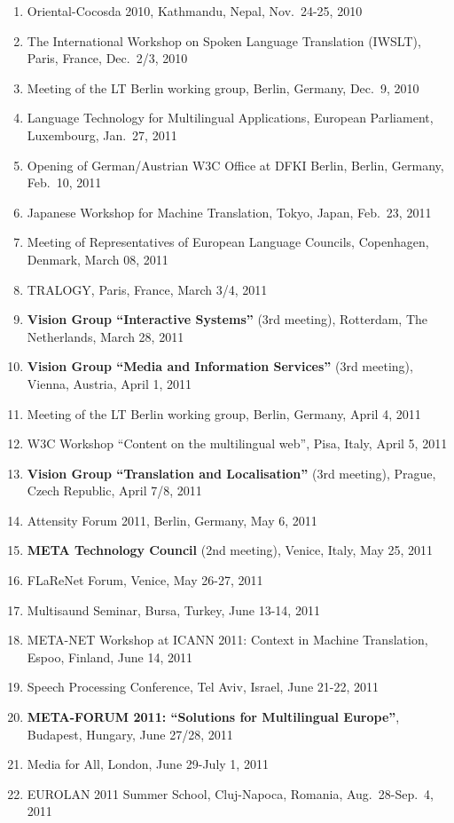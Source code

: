 \documentclass[10pt, plain]{../../metanetpaper}
\begin{document}
\begin{small}
\begin{enumerate}
\item Oriental-Cocosda 2010, Kathmandu, Nepal, Nov.~24-25, 2010
\item The International Workshop on Spoken Language Translation (IWSLT), Paris, France, Dec.~2/3, 2010
\item Meeting of the LT Berlin working group, Berlin, Germany, Dec.~9, 2010
\item Language Technology for Multilingual Applications, European Parliament, Luxembourg, Jan.~27, 2011
\item Opening of German/Austrian W3C Office at DFKI Berlin, Berlin, Germany, Feb.~10, 2011
\item Japanese Workshop for Machine Translation, Tokyo, Japan, Feb.~23, 2011
\item Meeting of Representatives of European Language Councils, Copenhagen, Denmark, March 08, 2011
\item TRALOGY, Paris, France, March 3/4, 2011
\item \textbf{Vision Group ``Interactive Systems''} (3rd meeting), Rotterdam, The Netherlands, March 28, 2011
\item \textbf{Vision Group ``Media and Information Services''} (3rd meeting), Vienna, Austria, April 1, 2011
\item Meeting of the LT Berlin working group, Berlin, Germany, April 4, 2011
\item W3C Workshop ``Content on the multilingual web'', Pisa, Italy, April 5, 2011
\item \textbf{Vision Group ``Translation and Localisation''} (3rd meeting), Prague, Czech Republic, April 7/8, 2011
\item Attensity Forum 2011, Berlin, Germany, May 6, 2011
\item \textbf{META Technology Council} (2nd meeting), Venice, Italy, May 25, 2011
\item FLaReNet Forum, Venice, May 26-27, 2011
\item Multisaund Seminar, Bursa, Turkey, June 13-14, 2011
\item META-NET Workshop at ICANN 2011: Context in Machine Translation,
Espoo, Finland, June 14, 2011
\item Speech Processing Conference, Tel Aviv, Israel, June 21-22, 2011
\item \textbf{META-FORUM 2011: ``Solutions for Multilingual Europe''}, Budapest, Hungary, June 27/28, 2011
\item Media for All, London, June 29-July 1, 2011
\item EUROLAN 2011 Summer School, Cluj-Napoca, Romania, Aug.~28-Sep.~4, 2011

\end{enumerate}
\end{small}
\end{document}
